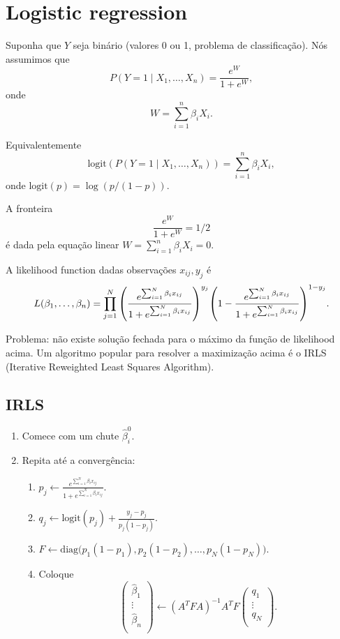 \documentclass[a4paper,fleqn,12pt]{article}
\begin{document}
\section{Logistic regression}

Suponha que $Y$ seja binário (valores 0 ou 1, problema de classificação). Nós assumimos que
$$
P(Y=1 \mid X_1, \ldots, X_n) = \frac{e^W}{1 + e^W},
$$
onde
$$
W = \sum_{i=1}^n \beta_i X_i.
$$

Equivalentemente
$$
\text{logit}(P(Y=1 \mid X_1, \ldots, X_n)) = \sum_{i=1}^n \beta_i X_i,
$$
onde $\text{logit}(p) = \log(p/(1-p))$.

A fronteira
$$
\frac{e^W}{1+e^W} = 1/2
$$
é dada pela equação linear $W = \sum_{i=1}^n \beta_i X_i = 0$.

A likelihood function dadas observações $x_{ij}, y_j$ é
$$
L(\beta_1, \ldots, \beta_n) =
\prod_{j=1}^N \qty(\frac{e^{\sum_{i=1}^N \beta_i x_{ij}}}{1 + e^{\sum_{i=1}^N \beta_i x_{ij}}})^{y_j} \qty(1 - \frac{e^{\sum_{i=1}^N \beta_i x_{ij}}}{1 + e^{\sum_{i=1}^N \beta_i x_{ij}}})^{1-y_j}.
$$

Problema: não existe solução fechada para o máximo da função de likelihood acima. Um algoritmo popular para resolver a maximização acima é o IRLS (Iterative Reweighted Least Squares Algorithm).

\subsection{IRLS}

\begin{enumerate}
\item Comece com um chute $\hat{\beta}_i^0$.
\item Repita até a convergência:
\begin{enumerate}
\item $p_j \leftarrow \frac{e^{\sum_{i=1}^N \beta_i x_{ij}}}{1+e^{\sum_{i=1}^N \beta_i x_{ij}}}$.
\item $q_j \leftarrow \text{logit}(p_j) + \frac{y_j - p_j}{p_j(1-p_j)}$.
\item $F \leftarrow \text{diag}\Big(p_1(1-p_1), p_2(1-p_2), \ldots, p_N(1-p_N)\Big)$.
\item Coloque
$$
\begin{pmatrix}
\hat{\beta}_1 \\
\vdots \\
\hat{\beta}_n \\
\end{pmatrix} \leftarrow
(A^T FA)^{-1} A^T F
\begin{pmatrix}
q_1 \\
\vdots \\
q_N \\
\end{pmatrix}.
$$
\end{enumerate}
\end{enumerate}
\end{document}
